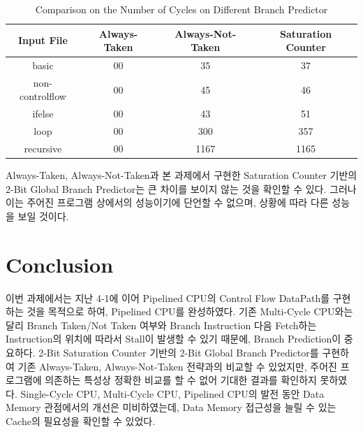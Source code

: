 \documentclass[openright, a4paper]{article}
\begin{document}
\begin{table}[!h]
  \centering
  \begin{tabular}{@{}cccc@{}}
    \hline
    Input File & Always-Taken & Always-Not-Taken & Saturation Counter \\
    \hline
    basic & 00 & 35 & 37 \\
    non-controlflow & 00 & 45 & 46 \\
    ifelse & 00 & 43 & 51 \\
    loop & 00 & 300 & 357 \\
    recursive & 00 & 1167 & 1165 \\
    \hline
  \end{tabular}
  \caption{Comparison on the Number of Cycles on Different Branch Predictor}
  \label{tab:comparison}
\end{table}

Always-Taken, Always-Not-Taken과 본 과제에서 구현한 Saturation Counter 기반의 2-Bit Global Branch Predictor는 큰 차이를 보이지 않는 것을 확인할 수 있다.
그러나 이는 주어진 프로그램 상에서의 성능이기에 단언할 수 없으며, 상황에 따라 다른 성능을 보일 것이다.



\section{Conclusion}

이번 과제에서는 지난 4-1에 이어 Pipelined CPU의 Control Flow DataPath를 구현하는 것을 목적으로 하여, Pipelined CPU를 완성하였다.
기존 Multi-Cycle CPU와는 달리 Branch Taken/Not Taken 여부와 Branch Instruction 다음 Fetch하는 Instruction의 위치에 따라서 Stall이 발생할 수 있기 때문에, Branch Prediction이 중요하다.
2-Bit Saturation Counter 기반의 2-Bit Global Branch Predictor를 구현하여 기존 Always-Taken, Always-Not-Taken 전략과의 비교할 수 있었지만, 주어진 프로그램에 의존하는 특성상 정확한 비교를 할 수 없어 기대한 결과를 확인하지 못하였다.
Single-Cycle CPU, Multi-Cycle CPU, Pipelined CPU의 발전 동안 Data Memory 관점에서의 개선은 미비하였는데, Data Memory 접근성을 늘릴 수 있는 Cache의 필요성을 확인할 수 있었다.
\end{document}
